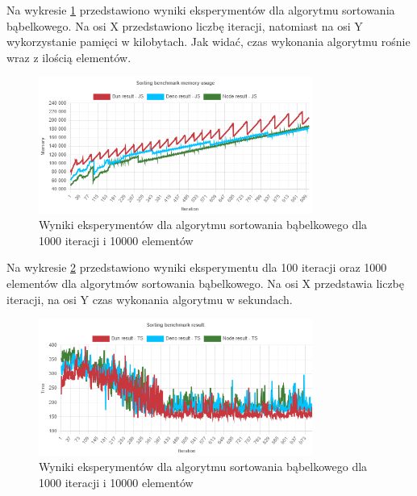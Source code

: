 Na wykresie \ref{fig:quick_sorting_e6_memory_js} przedstawiono wyniki eksperymentów dla algorytmu sortowania bąbelkowego. Na osi X przedstawiono liczbę iteracji, natomiast na osi Y wykorzystanie pamięci w kilobytach. Jak widać, czas wykonania algorytmu rośnie wraz z ilością elementów.
\begin{figure}[H]
  \centering
  \includegraphics[width=0.8\textwidth]{Figures/sorting/quick/e6_memory_js.png}
  \caption{Wyniki eksperymentów dla algorytmu sortowania bąbelkowego dla 1000 iteracji i 10000 elementów}
  \label{fig:quick_sorting_e6_memory_js}
\end{figure}

Na wykresie \ref{fig:quick_sorting_e6_ts} przedstawiono wyniki eksperymentu dla 100 iteracji oraz 1000 elementów dla algorytmów sortowania bąbelkowego. Na osi X przedstawia liczbę iteracji, na osi Y czas wykonania algorytmu w sekundach. 

\begin{figure}[H]
  \centering
  \includegraphics[width=0.8\textwidth]{Figures/sorting/quick/e6_ts.png}
  \caption{Wyniki eksperymentów dla algorytmu sortowania bąbelkowego dla 1000 iteracji i 10000 elementów}
  \label{fig:quick_sorting_e6_ts}
\end{figure}

